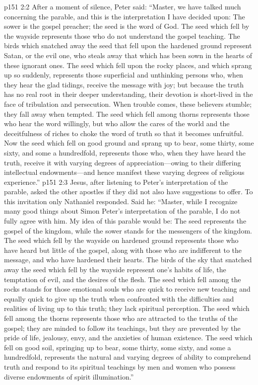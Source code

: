 \vs p151 2:2 After a moment of silence, Peter said: “Master, we have talked much concerning the parable, and this is the interpretation I have decided upon: The sower is the gospel preacher; the seed is the word of God. The seed which fell by the wayside represents those who do not understand the gospel teaching. The birds which snatched away the seed that fell upon the hardened ground represent Satan, or the evil one, who steals away that which has been sown in the hearts of these ignorant ones. The seed which fell upon the rocky places, and which sprang up so suddenly, represents those superficial and unthinking persons who, when they hear the glad tidings, receive the message with joy; but because the truth has no real root in their deeper understanding, their devotion is short\hyp{}lived in the face of tribulation and persecution. When trouble comes, these believers stumble; they fall away when tempted. The seed which fell among thorns represents those who hear the word willingly, but who allow the cares of the world and the deceitfulness of riches to choke the word of truth so that it becomes unfruitful. Now the seed which fell on good ground and sprang up to bear, some thirty, some sixty, and some a hundredfold, represents those who, when they have heard the truth, receive it with varying degrees of appreciation---owing to their differing intellectual endowments---and hence manifest these varying degrees of religious experience.”
\vs p151 2:3 Jesus, after listening to Peter’s interpretation of the parable, asked the other apostles if they did not also have suggestions to offer. To this invitation only Nathaniel responded. Said he: “Master, while I recognize many good things about Simon Peter’s interpretation of the parable, I do not fully agree with him. My idea of this parable would be: The seed represents the gospel of the kingdom, while the sower stands for the messengers of the kingdom. The seed which fell by the wayside on hardened ground represents those who have heard but little of the gospel, along with those who are indifferent to the message, and who have hardened their hearts. The birds of the sky that snatched away the seed which fell by the wayside represent one’s habits of life, the temptation of evil, and the desires of the flesh. The seed which fell among the rocks stands for those emotional souls who are quick to receive new teaching and equally quick to give up the truth when confronted with the difficulties and realities of living up to this truth; they lack spiritual perception. The seed which fell among the thorns represents those who are attracted to the truths of the gospel; they are minded to follow its teachings, but they are prevented by the pride of life, jealousy, envy, and the anxieties of human existence. The seed which fell on good soil, springing up to bear, some thirty, some sixty, and some a hundredfold, represents the natural and varying degrees of ability to comprehend truth and respond to its spiritual teachings by men and women who possess diverse endowments of spirit illumination.”
